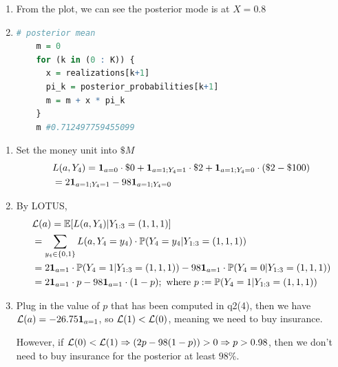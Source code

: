\documentclass{article}
\begin{document}
\begin{enumerate}
  \item From the plot, we can see the posterior mode is at $X = 0.8$
  
  \item 
  \begin{lstlisting}[language=R]
    # posterior mean
    m = 0
    for (k in (0 : K)) {
      x = realizations[k+1]
      pi_k = posterior_probabilities[k+1]
      m = m + x * pi_k
    }
    m #0.712497759455099 
  \end{lstlisting}
\end{enumerate}





\begin{enumerate}
  \item Set the money unit into $\$M$ 
  \begin{align*}
    & L(a, Y_4) = {\mathbf 1}_{a = 0} \cdot \$0 + {\mathbf 1}_{a = 1; Y_4 = 1} \cdot \$2 + {\mathbf 1}_{a = 1; Y_4 = 0} \cdot (\$2 - \$100)\\
    & = 2 {\mathbf 1}_{a = 1; Y_4 = 1} - 98 {\mathbf 1}_{a = 1; Y_4 = 0}\\
  \end{align*}


  \item By LOTUS,
  \begin{align*}
   & {\cal L}(a) = \mathbb{E}[L(a, Y_4) | Y_{1:3} = (1,1,1)]\\
   & = \sum_{y_4 \in \{0,1\}} L(a, Y_4=y_4) \cdot \mathbb{P}(Y_4 = y_4 | Y_{1:3} = (1,1,1))\\
   & = 2{\mathbf 1}_{a=1} \cdot \mathbb{P}(Y_4 = 1 | Y_{1:3} = (1,1,1)) - 98 {\mathbf 1}_{a=1} \cdot \mathbb{P}(Y_4 = 0 | Y_{1:3} = (1,1,1))\\
   & = 2{\mathbf 1}_{a=1}\cdot p - 98{\mathbf 1}_{a=1} \cdot (1-p); \text{ where } p := \mathbb{P}(Y_4 = 1 | Y_{1:3} = (1,1,1))\\
  \end{align*}


  \item Plug in the value of $p$ that has been computed in q2(4), then we have ${\cal L}(a) = -26.75{\mathbf 1}_{a=1}$, so ${\cal L}(1) < {\cal L}(0)$, meaning we need to buy insurance. 
  
  However, if ${\cal L}(0) < {\cal L}(1) \Rightarrow (2p-98(1-p)) > 0 \Rightarrow p > 0.98$, then we don't need to buy insurance for the posterior at least $98\%$.
\end{enumerate}
\end{document}
